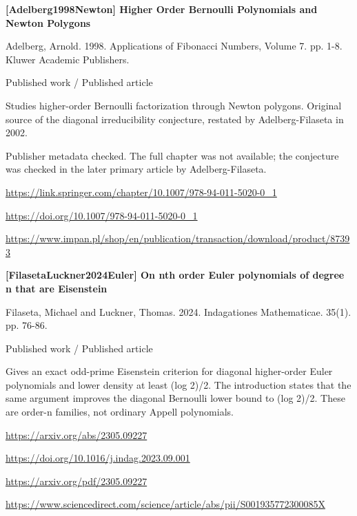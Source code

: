 \documentclass[11pt,a4paper,oneside,openany]{book}
\begin{document}
\hypertarget{ref:Adelberg1998Newton}{}
{\sffamily\bfseries\color{atlasgreen}[Adelberg1998Newton] Higher Order Bernoulli Polynomials and Newton Polygons}\par
\color{black} Adelberg, Arnold. 1998. Applications of Fibonacci Numbers, Volume 7. pp. 1-8. Kluwer Academic Publishers.\par
{\small\sffamily\color{atlasgold}Published work / Published article}\par
\color{black} Studies higher-order Bernoulli factorization through Newton polygons. Original source of the diagonal irreducibility conjecture, restated by Adelberg-Filaseta in 2002.\par
{\small Publisher metadata checked. The full chapter was not available; the conjecture was checked in the later primary article by Adelberg-Filaseta.}\par
{\footnotesize\url{https://link.springer.com/chapter/10.1007/978-94-011-5020-0_1}}\par
{\footnotesize\url{https://doi.org/10.1007/978-94-011-5020-0_1}}\par
{\footnotesize\url{https://www.impan.pl/shop/en/publication/transaction/download/product/87393}}\par
\vspace{9pt}
\hypertarget{ref:FilasetaLuckner2024Euler}{}
{\sffamily\bfseries\color{atlasgreen}[FilasetaLuckner2024Euler] On nth order Euler polynomials of degree n that are Eisenstein}\par
\color{black} Filaseta, Michael and Luckner, Thomas. 2024. Indagationes Mathematicae. 35(1). pp. 76-86.\par
{\small\sffamily\color{atlasgold}Published work / Published article}\par
\color{black} Gives an exact odd-prime Eisenstein criterion for diagonal higher-order Euler polynomials and lower density at least (log 2)/2. The introduction states that the same argument improves the diagonal Bernoulli lower bound to (log 2)/2. These are order-n families, not ordinary Appell polynomials.\par
{\footnotesize\url{https://arxiv.org/abs/2305.09227}}\par
{\footnotesize\url{https://doi.org/10.1016/j.indag.2023.09.001}}\par
{\footnotesize\url{https://arxiv.org/pdf/2305.09227}}\par
{\footnotesize\url{https://www.sciencedirect.com/science/article/abs/pii/S001935772300085X}}\par
\end{document}
